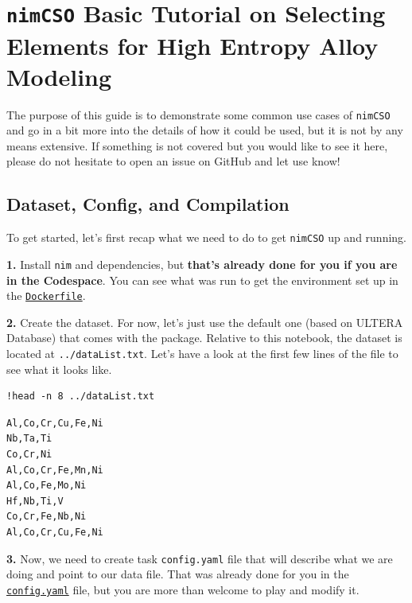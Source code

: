 \chapter{\texttt{nimCSO} Basic Tutorial on Selecting Elements for High Entropy Alloy Modeling} \label{chap:nimcsotutorial}

The purpose of this guide is to demonstrate some common use cases of
\texttt{nimCSO} and go in a bit more into the details
of how it could be used, but it is not by any means extensive. If
something is not covered but you would like to see it here, please do
not hesitate to open an issue on GitHub and let use know!

\hypertarget{dataset-config-and-compilation}{%
\section{Dataset, Config, and
Compilation}\label{nimcsotutorial:dataset-config-and-compilation}}

To get started, let's first recap what we need to do to get
\texttt{nimCSO} up and running.

\textbf{1.} Install \texttt{nim} and dependencies, but \textbf{that's already
done for you if you are in the Codespace}. You can see what was run to
get the environment set up in the
\href{../.devcontainer/Dockerfile}{\texttt{Dockerfile}}.

\textbf{2.} Create the dataset. For now, let's just use the default one
(based on ULTERA Database) that comes with the package. Relative to this
notebook, the dataset is located at
\texttt{../dataList.txt}. Let's have a look at the
first few lines of the file to see what it looks like.

\begin{verbatim}
!head -n 8 ../dataList.txt
\end{verbatim}

\begin{verbatim}
Al,Co,Cr,Cu,Fe,Ni
Nb,Ta,Ti
Co,Cr,Ni
Al,Co,Cr,Fe,Mn,Ni
Al,Co,Fe,Mo,Ni
Hf,Nb,Ti,V
Co,Cr,Fe,Nb,Ni
Al,Co,Cr,Cu,Fe,Ni
\end{verbatim}

\textbf{3.} Now, we need to create task
\texttt{config.yaml} file that will describe what we
are doing and point to our data file. That was already done for you in
the \href{config.yaml}{\texttt{config.yaml}} file, but
you are more than welcome to play and modify it.

